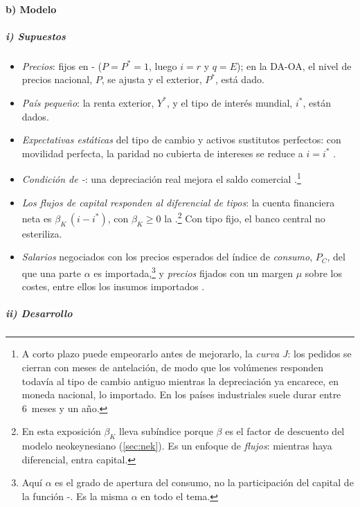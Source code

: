 \documentclass[11pt]{article}
\begin{document}
\paragraph{b) Modelo}

\subparagraph{i) Supuestos}

\begin{itemize}
\item \emph{Precios}: fijos en - ($P=P^*=1$, luego $i=r$ y $q=E$); en la DA-OA, el nivel de precios nacional, $P$, se ajusta y el exterior, $P^*$, está dado.
\item \emph{País pequeño}: la renta exterior, $Y^*$, y el tipo de interés mundial, $i^*$, están dados.
\item \emph{Expectativas estáticas} del tipo de cambio y activos sustitutos perfectos: con movilidad perfecta, la paridad no cubierta de intereses se reduce a $i=i^*$ .
\item \emph{Condición de -}: una depreciación real mejora el saldo comercial .\footnote{A corto plazo puede empeorarlo antes de mejorarlo, la \emph{curva J}: los pedidos se cierran con meses de antelación, de modo que los volúmenes responden todavía al tipo de cambio antiguo mientras la depreciación ya encarece, en moneda nacional, lo importado. En los países industriales suele durar entre 6~meses y un año\nocite{KrugmanObstfeldMelitz2018International}.}
\item \emph{Los flujos de capital responden al diferencial de tipos}: la cuenta financiera neta es $\beta_K\,(i-i^*)$, con $\beta_K\geq0$ la .\footnote{En esta exposición $\beta_K$ lleva subíndice porque $\beta$ es el factor de descuento del modelo neokeynesiano (\ref{sec:nek}). Es un enfoque de \emph{flujos}: mientras haya diferencial, entra capital.} Con tipo fijo, el banco central no esteriliza.
\item \emph{Salarios} negociados con los precios esperados del índice de \emph{consumo}, $P_C$, del que una parte $\alpha$ es importada,\footnote{Aquí $\alpha$ es el grado de apertura del consumo, no la participación del capital de la función -. Es la misma $\alpha$ en todo el tema.} y \emph{precios} fijados con un margen $\mu$ sobre los costes, entre ellos los insumos importados .
\end{itemize}

\subparagraph{ii) Desarrollo}
\end{document}
